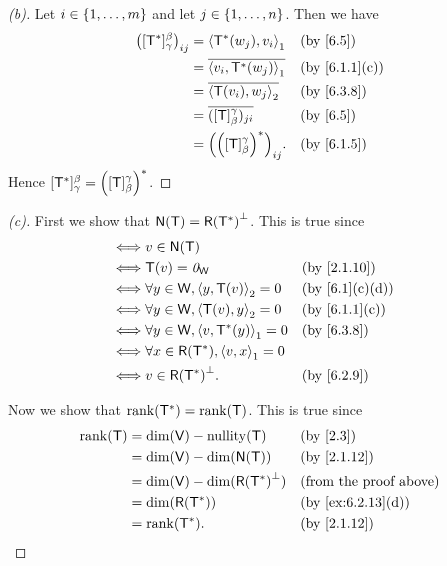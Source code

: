 \begin{proof}[(b)]
  Let \(i \in \left\lbrace1, \dots, m\right\rbrace\) and let \(j \in \left\lbrace1, \dots, n\right\rbrace\).
  Then we have
  \begin{align*}
    \pa{[\T^*]_{\gamma}^{\beta}}_{i j} & = \inn{\T^*(w_j), v_i}_1                   &  & \by{6.5}      \\
                                       & = \conj{\inn{v_i, \T^*(w_j)}_1}            &  & \by{6.1.1}[c] \\
                                       & = \conj{\inn{\T(v_i), w_j}_2}              &  & \by{6.3.8}    \\
                                       & = \conj{([\T]_{\beta}^{\gamma})_{j i}}     &  & \by{6.5}      \\
                                       & = \pa{\pa{[\T]_{\beta}^{\gamma}}^*}_{i j}. &  & \by{6.1.5}
  \end{align*}
  Hence \([\mathsf{T}^*]_{\gamma}^{\beta} = \left\lparen[\mathsf{T}]_{\beta}^{\gamma}\right\rparen^*\).
\end{proof}

\begin{proof}[(c)]
  First we show that \(\ns{\T} = \rg{\T^*}^{\perp}\).
  This is true since
  \begin{align*}
    \iff & v \in \ns{\T}                                                \\
    \iff & \T(v) = \zv_{\W}                          &  & \by{2.1.10}   \\
    \iff & \forall y \in \W, \inn{y, \T(v)}_2 = 0    &  & \by{6.1}[c,d] \\
    \iff & \forall y \in \W, \inn{\T(v), y}_2 = 0    &  & \by{6.1.1}[c] \\
    \iff & \forall y \in \W, \inn{v, \T^*(y)}_1 = 0  &  & \by{6.3.8}    \\
    \iff & \forall x \in \rg{\T^*}, \inn{v, x}_1 = 0                    \\
    \iff & v \in \rg{\T^*}^{\perp}.                  &  & \by{6.2.9}
  \end{align*}

  Now we show that \(\rk{\T^*} = \rk{\T}\).
  This is true since
  \begin{align*}
    \rk{\T} & = \dim(\V) - \nt{\T}                 &  & \by{2.3}                      \\
            & = \dim(\V) - \dim(\ns{\T})           &  & \by{2.1.12}                   \\
            & = \dim(\V) - \dim(\rg{\T^*}^{\perp}) &  & \text{(from the proof above)} \\
            & = \dim(\rg{\T^*})                    &  & \by{ex:6.2.13}[d]             \\
            & = \rk{\T^*}.                         &  & \by{2.1.12}
  \end{align*}
\end{proof}

